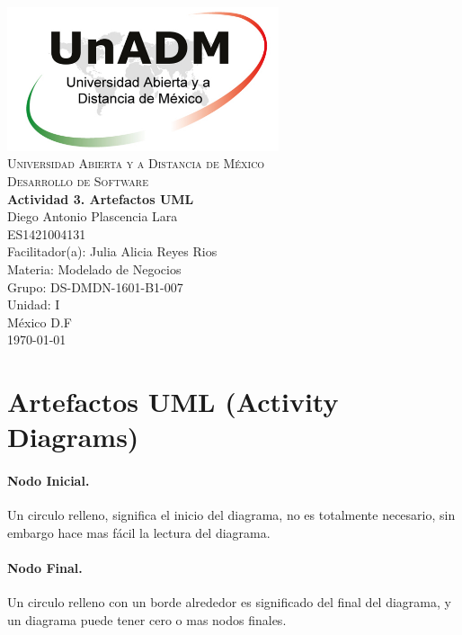 \documentclass[spanish,12pt,letterpapper]{article}
\begin{document}
	\begin{titlepage}
		\begin{center}
			\includegraphics[width=0.6\textwidth]{../logoUnADM}~\\[1cm] 
			\textsc{Universidad Abierta y a Distancia de México}\\[0.8cm]
			\textsc{Desarrollo de Software}\\[1.8cm]
			
			\textbf{ \Large Actividad 3. Artefactos UML}\\[3cm]
			
			Diego Antonio Plascencia Lara\\ ES1421004131 \\[0.4cm]
			Facilitador(a): Julia Alicia Reyes Rios\\
			Materia: Modelado de Negocios\\
			Grupo: DS-DMDN-1601-B1-007 \\
			Unidad: I \\
			
			\vfill México D.F\\{\today}
			
		\end{center}
	\end{titlepage}
	
	\section{Artefactos UML (Activity Diagrams)\\}
	\paragraph{Nodo Inicial.} Un circulo relleno, significa el inicio del diagrama, no es totalmente necesario, sin embargo hace mas fácil la lectura del diagrama.
	\paragraph{Nodo Final.} Un circulo relleno con un borde alrededor es significado del final del diagrama, y un diagrama puede tener cero o mas nodos finales.
\end{document}
